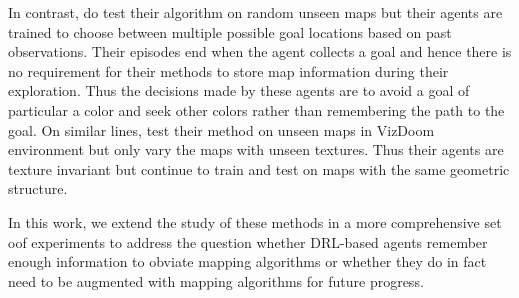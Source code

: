 In contrast, \cite{OhChSiICML2016} do test their algorithm on random unseen maps but their agents are trained to choose between multiple possible goal locations based on past observations.
Their episodes end when the agent collects a goal and hence there is no requirement for their methods to store map information during their exploration.
Thus the decisions made by these agents are to avoid a goal of particular a color and seek other colors rather than remembering the path to the goal.
On similar lines, \cite{ChLaSaNIPS2016} test their method on unseen maps in VizDoom environment but only vary the maps with unseen textures. Thus their agents are texture invariant but continue to train and test on maps with the same geometric structure.
%

In this work, we extend the study of these methods in a more comprehensive set oof experiments to address the question whether DRL-based agents remember enough information to obviate mapping algorithms or whether they do in fact need to be augmented with mapping algorithms for future progress.
